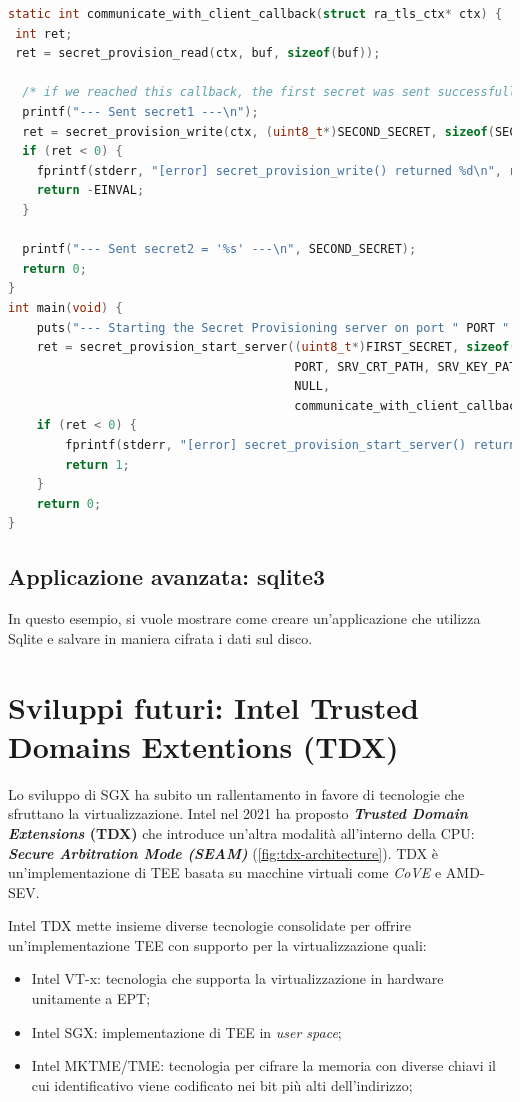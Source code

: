\documentclass{article}
\begin{document}
\begin{lstlisting}[language=c,caption=Interazione continua con il client,label=lst:server-secret-prov-callback]
static int communicate_with_client_callback(struct ra_tls_ctx* ctx) {
 int ret;
 ret = secret_provision_read(ctx, buf, sizeof(buf));

  /* if we reached this callback, the first secret was sent successfully */
  printf("--- Sent secret1 ---\n");
  ret = secret_provision_write(ctx, (uint8_t*)SECOND_SECRET, sizeof(SECOND_SECRET));
  if (ret < 0) {
    fprintf(stderr, "[error] secret_provision_write() returned %d\n", ret);
    return -EINVAL;
  }

  printf("--- Sent secret2 = '%s' ---\n", SECOND_SECRET);
  return 0;
}
int main(void) {
    puts("--- Starting the Secret Provisioning server on port " PORT " ---");
    ret = secret_provision_start_server((uint8_t*)FIRST_SECRET, sizeof(FIRST_SECRET),
                                        PORT, SRV_CRT_PATH, SRV_KEY_PATH,
                                        NULL,
                                        communicate_with_client_callback);
    if (ret < 0) {
        fprintf(stderr, "[error] secret_provision_start_server() returned %d\n", ret);
        return 1;
    }
    return 0;
} 
\end{lstlisting}

\subsection{Applicazione avanzata: sqlite3}
In questo esempio, si vuole mostrare come creare un'applicazione che utilizza Sqlite e salvare in maniera cifrata i dati sul disco.

\clearpage
\section{Sviluppi futuri: Intel Trusted Domains Extentions (TDX)}
Lo sviluppo di SGX ha subito un rallentamento in favore di tecnologie che sfruttano la virtualizzazione. Intel nel 2021 ha proposto \textbf{\textit{Trusted Domain Extensions } (TDX)} che introduce un'altra modalità all'interno della CPU: \textbf{\textit{Secure Arbitration Mode (SEAM)}} (\cref{fig:tdx-architecture}). TDX è un'implementazione di TEE basata su macchine virtuali come \textit{CoVE} e AMD-SEV.

Intel TDX mette insieme diverse tecnologie consolidate per offrire un'implementazione TEE con supporto per la virtualizzazione\cite{Cheng2024} quali:
\begin{itemize}
  \item Intel VT-x: tecnologia che supporta la virtualizzazione in hardware unitamente a EPT;
  \item Intel SGX: implementazione di TEE in \textit{user space};
  \item Intel MKTME/TME: tecnologia per cifrare la memoria con diverse chiavi il cui identificativo viene codificato nei bit più alti dell'indirizzo;
\end{itemize}
\end{document}
